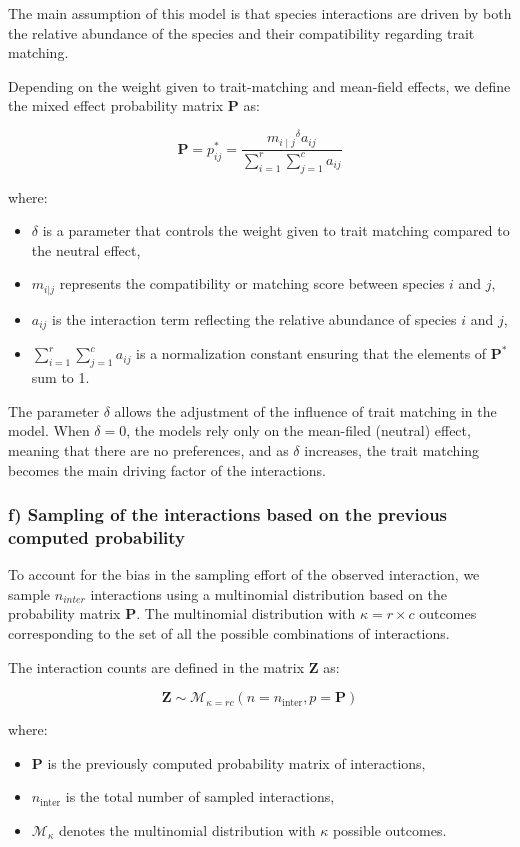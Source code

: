 The main assumption of this model is that species interactions are driven by both the relative abundance of the species and their compatibility regarding trait matching.

Depending on the weight given to trait-matching and mean-field effects, we define the mixed effect probability matrix $\mathbf{P}$ as: 

$$
    \mathbf{P} = p^*_{ij} = \frac{{m_{i\mid j}}^\delta a_{ij}}{\sum_{i=1}^{r} \sum_{j=1}^{c}a_{ij}}
$$
    
where:
\begin{itemize}
\item  $\delta$ is a parameter that controls the weight given to trait matching compared to the neutral effect,
\item  $m_{i|j}$ represents the compatibility or matching score between species \(i\) and \(j\),
\item  $a_{ij}$ is the interaction term reflecting the relative abundance of species \(i\) and \(j\),
\item  $\sum_{i=1}^{r} \sum_{j=1}^{c}a_{ij}$ is a normalization constant ensuring that the elements of \(\mathbf{P}^*\) sum to 1.
\end{itemize}

The parameter $\delta$ allows the adjustment of the influence of trait matching in the model. When $\delta = 0$, the models rely only on the mean-filed (neutral) effect, meaning that there are no preferences, and as $\delta$ increases, the trait matching becomes the main driving factor of the interactions.



\subsubsection{f) Sampling of the interactions based on the previous computed probability}

To account for the bias in the sampling effort of the observed interaction, we sample $n_{inter}$ interactions using a multinomial distribution based on the probability matrix $\mathbf{P}$. The multinomial distribution with $\kappa = r \times c$ outcomes corresponding to the set of all the possible combinations of interactions.

The interaction counts are defined in the matrix $\mathbf{Z}$ as:

$$
    \mathbf{Z} \sim \mathcal{M}_{\kappa = rc}(n = n_\text{inter}, p = \mathbf{P})
$$

where:
\begin{itemize}
    \item $\mathbf{P}$ is the previously computed probability matrix of interactions,
    \item  $n_{\text{inter}}$ is the total number of sampled interactions,
    \item  $\mathcal{M}_{\kappa}$ denotes the multinomial distribution with \(\kappa\) possible outcomes.
\end{itemize}



